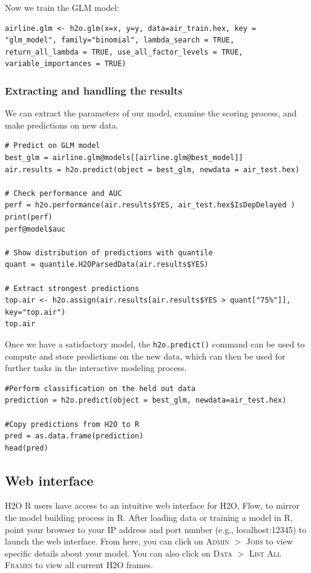 \documentclass[11pt]{article}
\begin{document}
Now we train the GLM model:

\begin{lstlisting}[style=R]
airline.glm <- h2o.glm(x=x, y=y, data=air_train.hex, key = "glm_model", family="binomial", lambda_search = TRUE, return_all_lambda = TRUE, use_all_factor_levels = TRUE, variable_importances = TRUE)
\end{lstlisting}

\subsubsection{Extracting and handling the results} \label{3.2.1}

We can extract the parameters of our model, examine the scoring process, and make predictions on new data.

\begin{lstlisting}[style=R]
# Predict on GLM model
best_glm = airline.glm@models[[airline.glm@best_model]]
air.results = h2o.predict(object = best_glm, newdata = air_test.hex)

# Check performance and AUC
perf = h2o.performance(air.results$YES, air_test.hex$IsDepDelayed )
print(perf)
perf@model$auc

# Show distribution of predictions with quantile
quant = quantile.H2OParsedData(air.results$YES)

# Extract strongest predictions
top.air <- h2o.assign(air.results[air.results$YES > quant["75%"]], key="top.air")
top.air
\end{lstlisting}

Once we have a satisfactory model, the \texttt{h2o.predict()} command can be used to compute and store predictions on the new data, which can then be used for further tasks in the interactive modeling process.
\begin{lstlisting}[style=R]
#Perform classification on the held out data
prediction = h2o.predict(object = best_glm, newdata=air_test.hex)

#Copy predictions from H2O to R
pred = as.data.frame(prediction)
head(pred)
\end{lstlisting}

\subsection{Web interface} \label{3.3}
H2O R users have access to an intuitive web interface for H2O, Flow, to mirror the model building process in R. After loading data or training a model in R, point your browser to your IP address and port number (e.g., localhost:12345) to launch the web interface. From here, you can click on \textsc{Admin} $>$ \textsc{Jobs} to view specific details about your model. You can also click on \textsc{Data} $>$ \textsc{List All Frames} to view all current H2O frames. 
\end{document}
